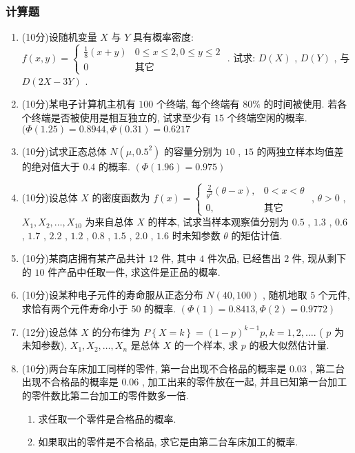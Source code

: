  \subsubsection{计算题}
 \begin{enumerate}
	\item (10分)设随机变量 $X$ 与 $Y$ 具有概率密度: $f(x,y)=
	\begin{cases}
	\frac{1}{8}(x+y) & 0\leq x\leq 2, 0\leq y\leq 2\\
	0 & \text{其它}
	\end{cases}
	$ . 试求: $D(X)$ , $D(Y)$ , 与 $D(2X-3Y)$ .

	\item (10分)某电子计算机主机有 $100$ 个终端, 每个终端有 $80\%$ 的时间被使用. 
	若各个终端是否被使用是相互独立的, 试求至少有 $15$ 个终端空闲的概率. $(\varPhi(1.25)=0.8944, \varPhi(0.31)=0.6217$
	
	\item (10分)试求正态总体 $N\left(\mu,0.5^2\right)$ 的容量分别为 $10$ , $15$ 的两独立样本均值差的绝对值大于 $0.4$ 的概率. $(\varPhi(1.96)=0.975)$
	
	\item (10分)设总体 $X$ 的密度函数为 $f(x)=
	\begin{cases}
	\frac{2}{\theta^2}(\theta-x), & 0<x<\theta\\
	0, & \text{其它}
	\end{cases}
	$ , $\theta>0$ , $X_1,X_2,\ldots,X_{10}$ 为来自总体 $X$ 的样本, 试求当样本观察值分别为 $0.5$ , $1.3$ , $0.6$ , $1.7$ , $2.2$ , $1.2$ , $0.8$ , $1.5$ , $2.0$ , $1.6$ 时未知参数 $\theta$ 的矩估计值.

	\item (10分)某商店拥有某产品共计 $12$ 件, 其中 $4$ 件次品, 已经售出 $2$ 件, 现从剩下的 $10$ 件产品中任取一件, 求这件是正品的概率.
	
	\item (10分)设某种电子元件的寿命服从正态分布 $N(40,100)$ , 随机地取 $5$ 个元件, 求恰有两个元件寿命小于 $50$ 的概率. $(\varPhi(1)=0.8413, \varPhi(2)=0.9772)$

	\item (12分)设总体 $X$ 的分布律为 $P\left\{X=k\right\}=(1-p)^{k-1}p, k=1,2,\ldots.$ ( $p$ 为未知参数), $X_1,X_2,\ldots,X_n$ 是总体 $X$ 的一个样本, 求 $p$ 的极大似然估计量.

	\item (10分)两台车床加工同样的零件, 第一台出现不合格品的概率是 $0.03$ , 第二台出现不合格品的概率是 $0.06$ , 加工出来的零件放在一起, 并且已知第一台加工的零件数比第二台加工的零件数多一倍.
	\begin{enumerate}
		\item 求任取一个零件是合格品的概率.
		\item 如果取出的零件是不合格品, 求它是由第二台车床加工的概率.
	\end{enumerate}


\end{enumerate}
